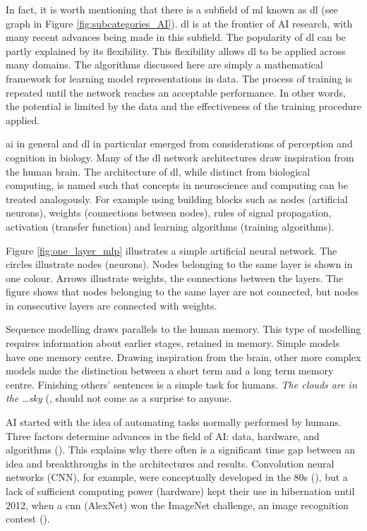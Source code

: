 In fact, it is worth mentioning that there is a subfield of \acrshort{ml} known as \acrshort{dl} (see graph in Figure \ref{fig:subcategories_AI}). 
\acrshort{dl} is at the frontier of AI research, with many recent advances being made in this subfield. The popularity of \acrshort{dl} can be partly explained by its flexibility. This flexibility allows \acrshort{dl} to be applied across many domains. The algorithms discussed here are simply a mathematical framework for learning model representations in data. The process of training is repeated until the network reaches an acceptable performance. In other words, the potential is limited by the data and the effectiveness of the training procedure applied.


\acrshort{ai} in general and \acrshort{dl} in particular emerged from considerations of perception and cognition in biology. Many of the \acrshort{dl} network architectures draw inspiration from the human brain. The architecture of \acrshort{dl}, while distinct from biological computing, is named such that concepts in neuroscience and computing can be treated analogously. For example using building blocks such as nodes (artificial neurons), weights (connections between nodes), rules of signal propagation, activation (transfer function) and learning algorithms (training algorithms).

Figure \ref{fig:one_layer_mlp} illustrates a simple artificial neural network. The circles illustrate nodes (neurons). Nodes belonging to the same layer is shown in one colour. Arrows illustrate weights, the connections between the layers. The figure shows that nodes belonging to the same layer are not connected, but nodes in consecutive layers are connected with weights. 

Sequence modelling draws parallels to the human memory. This type of modelling requires information about earlier stages, retained in memory. Simple models have one memory centre. Drawing inspiration from the brain, other more complex models make the distinction between a short term and a long term memory centre.
Finishing others' sentences is a simple task for humans. \textit{The clouds are in the \ldots sky} (\cite{colah_blog_post}, should not come as a surprise to anyone.

AI started with the idea of automating tasks normally performed by humans. Three factors determine advances in the field of AI: data, hardware, and algorithms (\cite{chollet_book}). This explains why there often is a significant time gap between an idea and breakthroughs in the architectures and results. Convolution neural networks (CNN), for example, were conceptually developed in the 80s (\cite{fukushima_neocognitron:_1980}), but a lack of sufficient computing power (hardware) kept their use in hibernation until 2012, when a \acrshort{cnn} (AlexNet) won the ImageNet challenge, an image recognition contest (\cite{AlexNet}).

